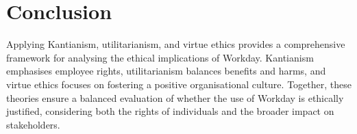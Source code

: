 \documentclass[a4paper]{article}
\begin{document}
\section*{Conclusion}
Applying Kantianism, utilitarianism, and virtue ethics provides a comprehensive framework for analysing the ethical implications of Workday. Kantianism emphasises employee rights, utilitarianism balances benefits and harms, and virtue ethics focuses on fostering a positive organisational culture. Together, these theories ensure a balanced evaluation of whether the use of Workday is ethically justified, considering both the rights of individuals and the broader impact on stakeholders.
\end{document}
